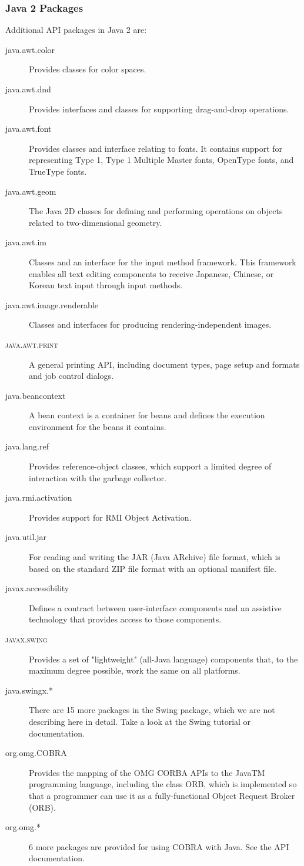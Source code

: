 \subsubsection{Java 2 Packages}
Additional API packages in Java 2 are:
\begin{description}
\item[java.awt.color] Provides classes for color spaces.
\item[java.awt.dnd] Provides interfaces and classes for supporting drag-and-drop operations.
\item[java.awt.font] Provides classes and interface relating to fonts. It contains support for representing Type 1, Type 1 Multiple Master fonts,
OpenType fonts, and TrueType fonts. 
\item[java.awt.geom] The Java 2D classes for defining and performing operations on objects related to two-dimensional geometry. 
\item[java.awt.im] Classes and an interface for the input method framework. This framework enables all text editing components to receive Japanese, Chinese, or Korean text input through input methods. 
\item[java.awt.image.renderable] Classes and interfaces for producing rendering-independent images.
\item[\textsc{java.awt.print}] A general printing API, including document types, 
  page setup and formats and job control dialogs.
\item[java.beancontext] A bean context is a container for beans and defines the execution environment for the beans it contains.
\item[java.lang.ref] Provides reference-object classes, which support a limited degree of interaction with the garbage collector.
\item[java.rmi.activation] Provides support for RMI Object Activation.
\item[java.util.jar] For reading and writing the JAR (Java ARchive) file format, which is based on the standard ZIP file format with an optional manifest file. 
\item[javax.accessibility] Defines a contract between user-interface components and an assistive technology that provides access to those components. 
\item[\textsc{javax.swing}] Provides a set of "lightweight" (all-Java language) components that, to the maximum degree possible, work the same on all
platforms. 
\item[java.swingx.*] There are 15 more packages in the Swing package, which we are not describing here in detail. Take a look at the Swing tutorial or documentation.
\item[org.omg.COBRA] Provides the mapping of the OMG CORBA APIs to the JavaTM programming language, including the class ORB, which is implemented so that a programmer can use it as a fully-functional Object Request Broker (ORB).
\item[org.omg.*] 6 more packages are provided for using COBRA with Java. See the API documentation.
\end{description}

